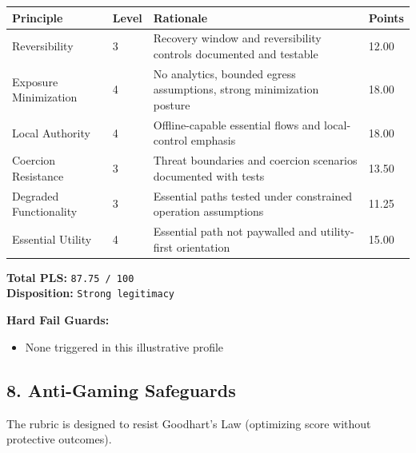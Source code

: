 \documentclass[
]{article}
\newcounter{none} %
\providecommand{\tightlist}{%
  \setlength{\itemsep}{0pt}\setlength{\parskip}{0pt}}
\begin{document}
{\def\LTcaptype{none} %
\begin{longtable}[]{@{}llll@{}}
\toprule\noalign{}
Principle & Level & Rationale & Points \\
\midrule\noalign{}
\endhead
\bottomrule\noalign{}
\endlastfoot
Reversibility & 3 & Recovery window and reversibility controls
documented and testable & 12.00 \\
Exposure Minimization & 4 & No analytics, bounded egress assumptions,
strong minimization posture & 18.00 \\
Local Authority & 4 & Offline-capable essential flows and local-control
emphasis & 18.00 \\
Coercion Resistance & 3 & Threat boundaries and coercion scenarios
documented with tests & 13.50 \\
Degraded Functionality & 3 & Essential paths tested under constrained
operation assumptions & 11.25 \\
Essential Utility & 4 & Essential path not paywalled and utility-first
orientation & 15.00 \\
\end{longtable}
}

\textbf{Total PLS:} \texttt{87.75\ /\ 100}\\
\textbf{Disposition:} \texttt{Strong\ legitimacy}

\textbf{Hard Fail Guards:}

\begin{itemize}
\tightlist
\item
  None triggered in this illustrative profile
\end{itemize}

\subsection{8. Anti-Gaming Safeguards}\label{8-anti-gaming-safeguards}

The rubric is designed to resist Goodhart's Law (optimizing score
without protective outcomes).
\end{document}
